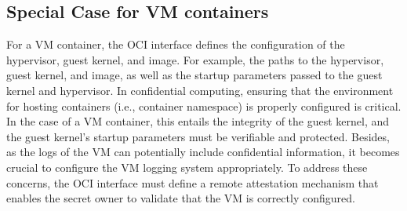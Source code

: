 \subsection{Special Case for VM containers}
\label{sec:security_analyse_oci_vm}
For a VM container, the OCI interface defines the configuration of the hypervisor, guest kernel, and image. For example, the paths to the hypervisor, guest kernel,  and image,  as well as the startup parameters passed to the guest kernel and hypervisor. In confidential computing, ensuring that the environment for hosting containers 
(i.e., container namespace) is properly configured is critical. In the case of a VM container,  this entails the integrity of the guest kernel, and the guest kernel's startup parameters must be verifiable and protected. Besides, as the logs of the VM can potentially include confidential information, it becomes crucial to configure 
the VM logging system appropriately. To address these concerns, the OCI interface must define a remote attestation mechanism that enables the secret owner to validate that the VM is correctly configured.



